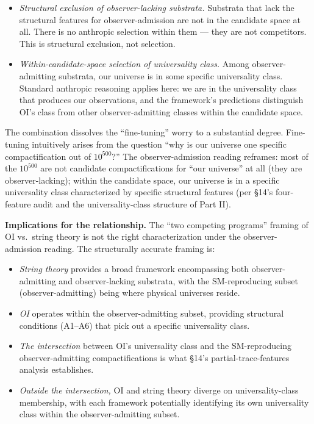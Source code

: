 \documentclass[
]{article}
\providecommand{\tightlist}{%
  \setlength{\itemsep}{0pt}\setlength{\parskip}{0pt}}
\begin{document}
\begin{itemize}
\item
  \emph{Structural exclusion of observer-lacking substrata.} Substrata
  that lack the structural features for observer-admission are not in
  the candidate space at all. There is no anthropic selection within
  them --- they are not competitors. This is structural exclusion, not
  selection.
\item
  \emph{Within-candidate-space selection of universality class.} Among
  observer-admitting substrata, our universe is in some specific
  universality class. Standard anthropic reasoning applies here: we are
  in the universality class that produces our observations, and the
  framework's predictions distinguish OI's class from other
  observer-admitting classes within the candidate space.
\end{itemize}

The combination dissolves the ``fine-tuning'' worry to a substantial
degree. Fine-tuning intuitively arises from the question ``why is our
universe one specific compactification out of \(10^{500}\)?'' The
observer-admission reading reframes: most of the \(10^{500}\) are not
candidate compactifications for ``our universe'' at all (they are
observer-lacking); within the candidate space, our universe is in a
specific universality class characterized by specific structural
features (per §14's four-feature audit and the universality-class
structure of Part II).

\textbf{Implications for the relationship.} The ``two competing
programs'' framing of OI vs.~string theory is not the right
characterization under the observer-admission reading. The structurally
accurate framing is:

\begin{itemize}
\tightlist
\item
  \emph{String theory} provides a broad framework encompassing both
  observer-admitting and observer-lacking substrata, with the
  SM-reproducing subset (observer-admitting) being where physical
  universes reside.
\item
  \emph{OI} operates within the observer-admitting subset, providing
  structural conditions (A1--A6) that pick out a specific universality
  class.
\item
  \emph{The intersection} between OI's universality class and the
  SM-reproducing observer-admitting compactifications is what §14's
  partial-trace-features analysis establishes.
\item
  \emph{Outside the intersection,} OI and string theory diverge on
  universality-class membership, with each framework potentially
  identifying its own universality class within the observer-admitting
  subset.
\end{itemize}
\end{document}
